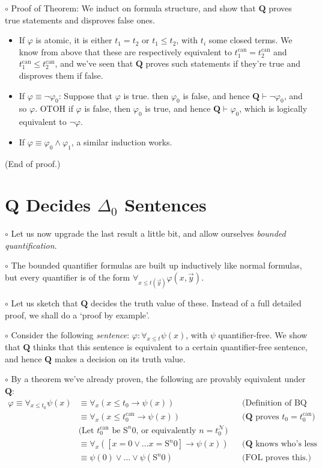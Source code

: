 \documentclass{article}
\newcommand{\RQ}{\mathbf{Q}}
\newcommand{\TN}{\mathcal{N}}
\newcommand{\suc}{\mathrm{S}}
\newcommand{\can}{\mathrm{can}}
\newcommand\point[1]{\noindent \hspace{\labelsep} {\small $\circ$ #1} \smallskip}
\newcommand\timestamp[1]{}
\newcommand\proofend{\hfill(End of proof.)}
\begin{document}
\point{Proof of Theorem: We induct on formula structure, and show that $\RQ$ proves true statements and disproves false ones.
\begin{itemize}
\item If $\varphi$ is atomic, it is either $t_1 = t_2$ or $t_1 \leq t_2$, with $t_i$ some closed terms. We know from above that these are respectively equivalent to $t_1^\can = t_2^\can$ and $t_1^\can \leq t_2^\can$, and we've seen that $\RQ$ proves such statements if they're true and disproves them if false.

\item If $\varphi \equiv \neg \varphi_0$: Suppose that $\varphi$ is true. then $\varphi_0$ is false, and hence $\RQ \vdash \neg \varphi_0$, and so $\varphi$. OTOH if $\varphi$ is false, then $\varphi_0$ is true, and hence $\RQ \vdash \varphi_0$, which is logically equivalent to $\neg \varphi$.

\item If $\varphi \equiv \varphi_0 \land \varphi_1$, a similar induction works.
\end{itemize}
\proofend}

\timestamp{43 min}

\section{$\RQ$ Decides $\Delta_0$ Sentences}

\point{Let us now upgrade the last result a little bit, and allow ourselves \emph{bounded quantification}.}

\point{The bounded quantifier formulas are built up inductively like normal formulas, but every quantifier is of the form $\forall_{x \leq t(\vec y)} \varphi(x, \vec y)$.}

\point{Let us sketch that $\RQ$ decides the truth value of these. Instead of a full detailed proof, we shall do a `proof by example'.}

\point{Consider the following \emph{sentence}: $\varphi \colon \forall_{x \leq t} \psi(x)$, with $\psi$ quantifier-free. We show that $\RQ$ thinks that this sentence is equivalent to a certain quantifier-free sentence, and hence $\RQ$ makes a decision on its truth value.}

\point{By a theorem we've already proven, the following are provably equivalent under $\RQ$:
\begin{equation}
\begin{aligned}
\varphi \equiv \forall_{x \leq t_0} \psi(x) &\equiv \forall_x (x \leq t_0 \rightarrow \psi(x)) && \text{(Definition of BQ by abbreviation)}\\
&\equiv \forall_x(x \leq t_0^\can \rightarrow \psi(x)) &&\text{($\RQ$ proves $t_0 = t_0^\can$)}\\
&\text{(Let $t_0^\can$ be $\suc^n 0$, or equivalently $n = t_0^\TN$)}\\
&\equiv \forall_x( [x = 0 \lor \dots x = \suc^n 0] \rightarrow \psi(x) )&& \text{($\RQ$ knows who's less than each natural number)}\\
&\equiv \psi(0) \lor \dots \lor \psi(\suc^n 0) &&\text{(FOL proves this.)}
\end{aligned}
\end{equation}}
\end{document}
